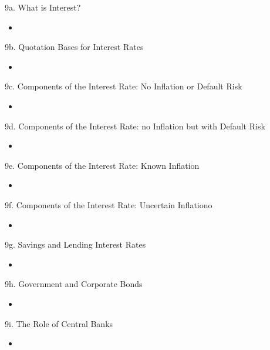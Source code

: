 \begin{CHPT_SUMM_AUTO}[label = {L.-9a}]{9a. What is Interest?}
	\begin{itemize}
		\item	
	\end{itemize}
\end{CHPT_SUMM_AUTO}

\begin{CHPT_SUMM_AUTO}[label = {L.-9b}]{9b. Quotation Bases for Interest Rates}
	\begin{itemize}
		\item	
	\end{itemize}
\end{CHPT_SUMM_AUTO}

\begin{CHPT_SUMM_AUTO}[label = {L.-9c}]{9c. Components of the Interest Rate: No Inflation or Default Risk}
	\begin{itemize}
		\item	
	\end{itemize}
\end{CHPT_SUMM_AUTO}

\begin{CHPT_SUMM_AUTO}[label = {L.-9d}]{9d. Components of the Interest Rate: no Inflation but with Default Risk}
	\begin{itemize}
		\item	
	\end{itemize}
\end{CHPT_SUMM_AUTO}

\begin{CHPT_SUMM_AUTO}[label = {L.-9e}]{9e. Components of the Interest Rate: Known Inflation}
	\begin{itemize}
		\item	
	\end{itemize}
\end{CHPT_SUMM_AUTO}

\begin{CHPT_SUMM_AUTO}[label = {L.-9f}]{9f. Components of the Interest Rate: Uncertain Inflationo}
	\begin{itemize}
		\item	
	\end{itemize}
\end{CHPT_SUMM_AUTO}

\begin{CHPT_SUMM_AUTO}[label = {L.-9g}]{9g. Savings and Lending Interest Rates}
	\begin{itemize}
		\item	
	\end{itemize}
\end{CHPT_SUMM_AUTO}

\begin{CHPT_SUMM_AUTO}[label = {L.-9h}]{9h. Government and Corporate Bonds}
	\begin{itemize}
		\item	
	\end{itemize}
\end{CHPT_SUMM_AUTO}

\begin{CHPT_SUMM_AUTO}[label = {L.-9i}]{9i. The Role of Central Banks}
	\begin{itemize}
		\item	
	\end{itemize}
\end{CHPT_SUMM_AUTO}